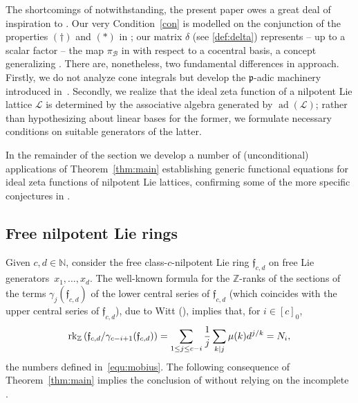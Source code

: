\documentclass[11pt]{amsart}
\numberwithin{equation}{section}
\numberwithin{figure}{section}
\theoremstyle{plain}
\theoremstyle{definition}
\theoremstyle{remark}
\begin{document}
The shortcomings of \cite[Conjecture~4.5]{duSWoodward/08}
notwithstanding, the present paper owes a great deal of inspiration to
\cite[Chapter~4]{duSWoodward/08}. Our very Condition~\ref{con} is
modelled on the conjunction of the properties $(\dag)$ and $(*)$ in
\cite[Definition~4.56]{duSWoodward/08}; our matrix $\delta$ (see
\eqref{def:delta}) represents -- up to a scalar factor -- the map
$\pi_{\mathcal{B}}$ in \cite[Definition~4.40]{duSWoodward/08} with
respect to a cocentral basis, a concept generalizing
\cite[Definition~4.37]{duSWoodward/08}. There are, nonetheless, two
fundamental differences in approach. Firstly, we do not analyze cone
integrals but develop the ${\mathfrak{p}}$-adic machinery introduced
in~\cite{Voll/10}. Secondly, we realize that the ideal zeta function
of a nilpotent Lie lattice ${\ensuremath{\mathcal{L}}}$ is determined by the associative
algebra generated by $\operatorname{ad}({\ensuremath{\mathcal{L}}})$; rather than hypothesizing about
linear bases for the former, we formulate necessary conditions on
suitable generators of the latter.

In the remainder of the section we develop a number of (unconditional)
applications of Theorem~\ref{thm:main} establishing generic functional
equations for ideal zeta functions of nilpotent Lie lattices,
confirming some of the more specific conjectures in
\cite{duSWoodward/08}.

\subsection{Free nilpotent Lie rings}\label{subsec:free.Lie.ring}
Given $c,d\in{\ensuremath{\mathbb{N}}}$, consider the free class-$c$-nilpotent Lie ring
${\ensuremath{\mathfrak{f}}}_{c,d}$ on free Lie generators~$x_1,\dots,x_d$. The well-known
formula for the ${\ensuremath{\mathbb{Z}}}$-ranks of the sections of the terms
$\gamma_j({\ensuremath{\mathfrak{f}}}_{c,d})$ of the lower central series of ${\ensuremath{\mathfrak{f}}}_{c,d}$
(which coincides with the upper central series of ${\ensuremath{\mathfrak{f}}}_{c,d}$), due
to Witt (\cite[Satz~3]{Witt/37}), implies that, for $i\in[c]_0$,
$${\ensuremath{{\rm rk}}}_{\ensuremath{\mathbb{Z}}}\left( {\ensuremath{\mathfrak{f}}}_{c,d} / \gamma_{c-i+1}({\ensuremath{\mathfrak{f}}}_{c,d})\right) =
\sum_{1 \leq j \leq c-i} \frac{1}{j}\sum_{k|j}\mu(k)d^{j/k} = N_i,$$ the
numbers defined in~\eqref{equ:mobius}.  The following consequence of
Theorem~\ref{thm:main} implies the conclusion of
\cite[Theorem~1.3]{duSWoodward/08} without relying on the incomplete
\cite[Conjecture~4.5]{duSWoodward/08}.
\end{document}
